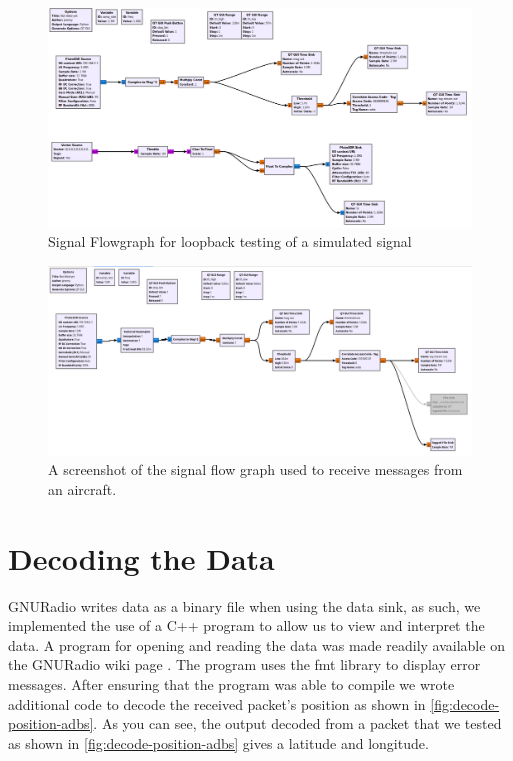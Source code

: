 \documentclass[conference, onecolumn]{IEEEtran}
\begin{document}
\begin{figure}
  \begin{center}
    \includegraphics[width=\textwidth]{./figures/fig_gnuradio_loopback_test.png}
  \end{center}
  \caption{Signal Flowgraph for loopback testing of a simulated signal}\label{fig:loopback_grc}
\end{figure}

\begin{figure}
  \begin{center}
    \includegraphics[width=\textwidth]{./figures/fig_sfg_gnuradio.png}
  \end{center}
  \caption{A screenshot of the signal flow graph used to receive messages from an aircraft.}\label{fig:fig_sfg_gnuradio}
\end{figure}


\section{Decoding the Data}
GNURadio writes data as a binary file when using the data sink, as such, we implemented the use of a C++ program to allow us to view and interpret the data. A program for opening and reading the data was made readily available on the GNURadio wiki page \cite{gnuradio-reading-file-cpp}. The program uses the fmt library\cite{fmt-library} to display error messages. After ensuring that the program was able to compile we wrote additional code to decode the received packet's position as shown in \autoref{fig:decode-position-adbs}. As you can see, the output decoded from a packet that we tested as shown in \autoref{fig:decode-position-adbs} gives a latitude and longitude.
\end{document}
